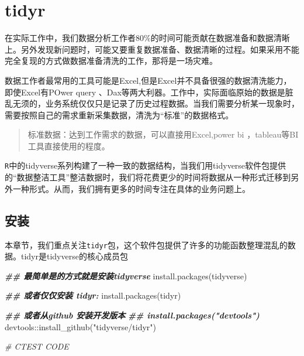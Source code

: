 \documentclass[
]{book}
\newenvironment{Shaded}{\begin{snugshade}}{\end{snugshade}}
\newcommand{\CommentTok}[1]{\textcolor[rgb]{0.56,0.35,0.01}{\textit{#1}}}
\newcommand{\DocumentationTok}[1]{\textcolor[rgb]{0.56,0.35,0.01}{\textbf{\textit{#1}}}}
\newcommand{\FunctionTok}[1]{\textcolor[rgb]{0.00,0.00,0.00}{#1}}
\newcommand{\NormalTok}[1]{#1}
\newcommand{\SpecialCharTok}[1]{\textcolor[rgb]{0.00,0.00,0.00}{#1}}
\newcommand{\StringTok}[1]{\textcolor[rgb]{0.31,0.60,0.02}{#1}}
\begin{document}
\hypertarget{tidyr}{%
\chapter{tidyr}\label{tidyr}}

在实际工作中，我们数据分析工作者80\%的时间可能贡献在数据准备和数据清晰上。另外发现新问题时，可能又要重复数据准备、数据清晰的过程。如果采用不能完全复现的方式做数据准备清洗的工作，那将是一场灾难。

数据工作者最常用的工具可能是Excel,但是Excel并不具备很强的数据清洗能力，即使Excel有POwer query 、Dax等两大利器。工作中，实际面临原始的数据是脏乱无须的，业务系统仅仅只是记录了历史过程数据。当我们需要分析某一现象时，需要按照自己的需求重新采集数据，清洗为``标准''的数据格式。

\begin{quote}
标准数据：达到工作需求的数据，可以直接用Excel,power bi ，tableau等BI工具直接使用的程度。
\end{quote}

\texttt{R}中的tidyverse系列构建了一种一致的数据结构，当我们用tidyverse软件包提供的``数据整洁工具''整洁数据时，我们将花费更少的时间将数据从一种形式迁移到另外一种形式。从而，我们拥有更多的时间专注在具体的业务问题上。

\hypertarget{ux5b89ux88c5-5}{%
\section{安装}\label{ux5b89ux88c5-5}}

本章节，我们重点关注\texttt{tidyr}包，这个软件包提供了许多的功能函数整理混乱的数据。tidyr是tidyverse的核心成员包

\begin{Shaded}
\begin{Highlighting}[]
\DocumentationTok{\#\# 最简单是的方式就是安装tidyverse}
\FunctionTok{install.packages}\NormalTok{(}\StringTok{\textquotesingle{}tidyverse\textquotesingle{}}\NormalTok{)}

\DocumentationTok{\#\# 或者仅仅安装 tidyr:}
\FunctionTok{install.packages}\NormalTok{(}\StringTok{\textquotesingle{}tidyr\textquotesingle{}}\NormalTok{)}

\DocumentationTok{\#\# 或者从github 安装开发版本}
\DocumentationTok{\#\# install.packages("devtools")}
\NormalTok{devtools}\SpecialCharTok{::}\FunctionTok{install\_github}\NormalTok{(}\StringTok{"tidyverse/tidyr"}\NormalTok{)}

\CommentTok{\# CTEST CODE}
\end{Highlighting}
\end{Shaded}
\end{document}
